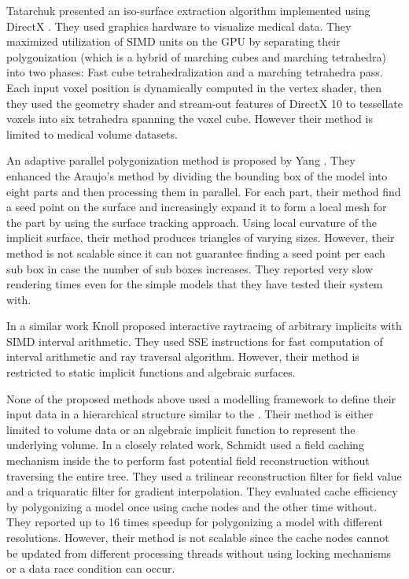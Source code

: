Tatarchuk \etal presented an iso-surface extraction algorithm implemented using DirectX \cite{Tatarchuk2008}. They used graphics 
hardware to visualize medical data. They maximized utilization of SIMD units on the GPU by separating their polygonization (which is a 
hybrid of marching cubes and marching tetrahedra) into two phases: Fast cube tetrahedralization and a marching tetrahedra pass. Each input 
voxel position is dynamically computed in the vertex shader, then they used the geometry shader and stream-out features of DirectX 10 to 
tessellate voxels into six tetrahedra spanning the voxel cube. However their method is limited to medical volume datasets.

An adaptive parallel polygonization method is proposed by Yang \etal \cite{Yang2010}. They enhanced the Araujo's method 
\cite{Rodriguesdearaujo2005} by dividing the bounding box of the model into eight parts and then processing them in parallel.
For each part, their method find a seed point on the surface and increasingly expand it to form a 
local mesh for the part by using the surface tracking approach. Using local curvature of the implicit 
surface, their method produces triangles of varying sizes. However, their method is not scalable since 
it can not guarantee finding a seed point per each sub box in case the number of sub boxes increases. 
They reported very slow rendering times even for the simple models that they have tested their system with. 


In a similar work Knoll \etal \cite{Knoll2007} proposed interactive raytracing of arbitrary implicits with 
SIMD interval arithmetic. They used SSE instructions for fast computation of interval arithmetic 
and ray traversal algorithm. However, their method is restricted to static implicit functions and 
algebraic surfaces.

None of the proposed methods above used a modelling framework to define their input data in a hierarchical structure similar to 
the \blobns. Their method is either limited to volume data or an algebraic implicit function to represent the underlying volume. 
In a closely related work, Schmidt \etal \cite{SWG2005} used a field caching mechanism inside the \blob to perform fast potential field 
reconstruction without traversing the entire tree. They used a trilinear reconstruction filter for field value and a triquaratic filter
for gradient interpolation. They evaluated cache efficiency by polygonizing a \blob model once using cache nodes and the other time 
without. They reported up to 16 times speedup for polygonizing a model with different resolutions. However, their method is not scalable since 
the cache nodes cannot be updated from different processing threads without using locking
mechanisms or a data race condition can occur. 

